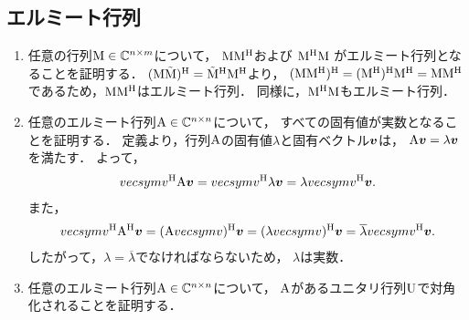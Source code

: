 \subsection{エルミート行列}
  \begin{enumerate}[label=(\roman*)]
    \item 任意の行列$\mathrm{M} \in \mathbb{C}^{n \times m}$について，
      $\mathrm{M}\mathrm{M}^\mathrm{H}$および
      $\mathrm{M}^\mathrm{H}\mathrm{M}$
      がエルミート行列となることを証明する．
      $(\mathrm{M}\tilde{\mathrm{M}})^\mathrm{H} = \tilde{\mathrm{M}}^\mathrm{H}\mathrm{M}^\mathrm{H}$より，
      $(\mathrm{M}\mathrm{M}^\mathrm{H})^\mathrm{H} = (\mathrm{M}^\mathrm{H})^\mathrm{H}\mathrm{M}^\mathrm{H} = \mathrm{M}\mathrm{M}^\mathrm{H}$
      であるため，$\mathrm{M}\mathrm{M}^\mathrm{H}$はエルミート行列．
      同様に，$\mathrm{M}^\mathrm{H}\mathrm{M}$もエルミート行列．
      
    \item 任意のエルミート行列$\mathrm{A} \in \mathbb{C}^{n \times n}$について，
      すべての固有値が実数となることを証明する．
      定義より，行列$\mathrm{A}$の固有値$\lambda$と固有ベクトル$\boldsymbol{v}$は，
      $\mathrm{A}\boldsymbol{v} = \lambda \boldsymbol{v}$を満たす．
      よって，
      \begin{align}
        vecsym{v}^\mathrm{H} \mathrm{A} \boldsymbol{v}
        = vecsym{v}^\mathrm{H} \lambda \boldsymbol{v}
        = \lambda vecsym{v}^\mathrm{H} \boldsymbol{v}.
      \end{align}
      また，
      \begin{align}
        vecsym{v}^\mathrm{H} \mathrm{A}^\mathrm{H} \boldsymbol{v}
        = (\mathrm{A} vecsym{v})^\mathrm{H} \boldsymbol{v}
        = (\lambda vecsym{v})^\mathrm{H} \boldsymbol{v}
        = \overline{\lambda} vecsym{v}^\mathrm{H} \boldsymbol{v}.
      \end{align}
      したがって，$\lambda = \overline{\lambda}$でなければならないため，
      $\lambda$は実数．
    
    \item 任意のエルミート行列$\mathrm{A} \in \mathbb{C}^{n \times n}$について，
      $\mathrm{A}$があるユニタリ行列$\mathrm{U}$で対角化されることを証明する．
      
  \end{enumerate}
